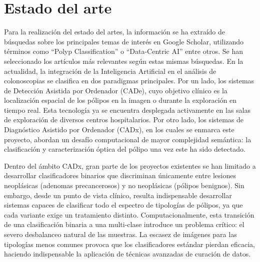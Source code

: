 ﻿\documentclass[10pt,a4paper,twocolumn,twoside]{article}
\begin{document}
\section{Estado del arte}
Para la realización del estado del artes, la información se ha extraído de búsquedas sobre los principales temas de interés en Google Scholar, utilizando términos como ``Polyp Classification'' o ``Data-Centric AI'' entre otros. Se han seleccionado los artículos más relevantes según estas mismas búsquedas.
En la actualidad, la integración de la Inteligencia Artificial en el análisis de colonoscopias se clasifica en dos paradigmas principales. Por un lado, los sistemas de Detección Asistida por Ordenador (CADe), cuyo objetivo clínico es la localización espacial de los pólipos en la imagen o durante la exploración en tiempo real. Esta tecnología ya se encuentra desplegada activamente en las salas de exploración de diversos centros hospitalarios. Por otro lado, los sistemas de Diagnóstico Asistido por Ordenador (CADx), en los cuales se enmarca este proyecto, abordan un desafío computacional de mayor complejidad semántica: la clasificación y caracterización óptica del pólipo una vez este ha sido detectado.

Dentro del ámbito CADx, gran parte de los proyectos existentes se han limitado a desarrollar clasificadores binarios que discriminan únicamente entre lesiones neoplásicas (adenomas precancerosos) y no neoplásicas (pólipos benignos). Sin embargo, desde un punto de vista clínico, resulta indispensable desarrollar sistemas capaces de clasificar todo el espectro de tipologías de pólipos, ya que cada variante exige un tratamiento distinto. Computacionalmente, esta transición de una clasificación binaria a una multi-clase introduce un problema crítico: el severo desbalanceo natural de las muestras. La escasez de imágenes para las tipologías menos comunes provoca que los clasificadores estándar pierdan eficacia, haciendo indispensable la aplicación de técnicas avanzadas de curación de datos.
\end{document}
